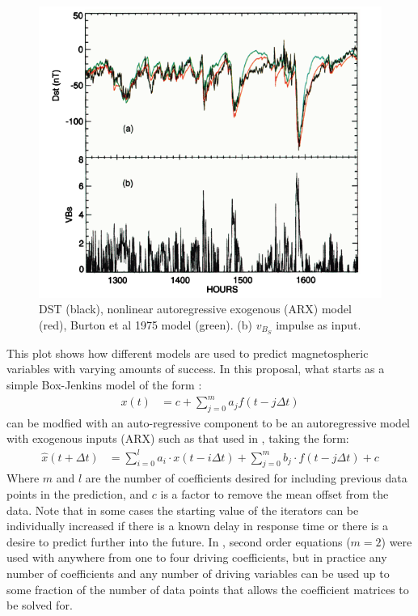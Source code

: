 \documentclass[10pt]{article}
\begin{document}
\begin{figure}[htp]
\centering
\includegraphics[scale=0.40]{VBzIR.png}
\caption{DST (black), nonlinear autoregressive exogenous (ARX) model (red), Burton et al 1975 model (green). (b) $v_{B_S}$ impulse as input.\citep{ARXEqn}}
\label{VBzIRplot}
\end{figure}

This plot shows how different models are used to predict magnetospheric variables with varying amounts of success. In this proposal, what starts as a simple Box-Jenkins model of the form \citep{DOYvar}:
\begin{align*}
x(t)&=c+\sum_{j=0}^{m}{a_j f(t-j\Delta t)}
\end{align*}
can be modfied with an auto-regressive component to be an autoregressive model with exogenous inputs (ARX) such as that used in \citep{ARXEqn}, taking the form:
\begin{align}
\hat{x}(t+\Delta t)&=\sum_{i=0}^la_i\cdot x(t-i\Delta t)+\sum_{j=0}^m b_j\cdot f(t-j\Delta t)+c
\label{ARXEqn}
\end{align}
Where $m$ and $l$ are the number of coefficients desired for including previous data points in the prediction, and $c$ is a factor to remove the mean offset from the data. Note that in some cases the starting value of the iterators can be individually increased if there is a known delay in response time or there is a desire to predict further into the future. In \cite{ARXEqn}, second order equations ($m=2$) were used with anywhere from one to four driving coefficients, but in practice any number of coefficients and any number of driving variables can be used up to some fraction of the number of data points that allows the coefficient matrices to be solved for. 
\end{document}
